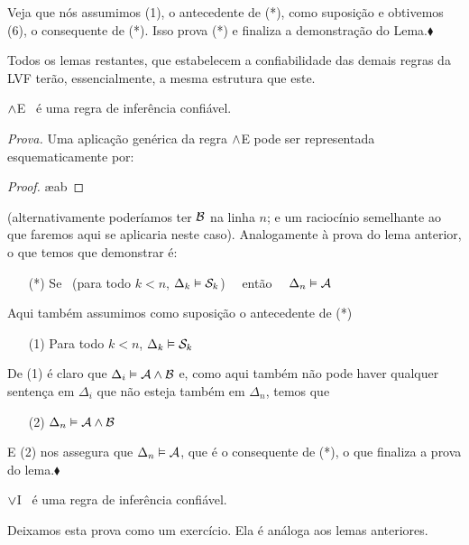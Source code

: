 Veja que nós assumimos (1), o antecedente de (*), como suposição e obtivemos (6), o consequente de (*). Isso prova (*) e finaliza a demonstração do Lema.$\blacklozenge$

Todos os lemas restantes, que estabelecem a confiabilidade das demais regras da LVF terão, essencialmente, a mesma estrutura que este.

\begin{factoidboxe}
	$\wedge$E \ é uma regra de inferência confiável.
\end{factoidboxe}

\noindent\emph{Prova.}
Uma aplicação genérica da regra $\wedge$E pode ser representada esquematicamente por:
	\begin{proof}
		 \ae{ab}
	\end{proof}\noindent
(alternativamente poderíamos ter $\mathcal{B}$ na linha $n$; e um raciocínio semelhante ao que faremos aqui se aplicaria neste caso).
Analogamente à prova do lema anterior, o que temos que demonstrar é:
\begin{itemize}
	\item[(*)]  Se  \ ({para todo}  $k<n$, $\Delta_k \vDash \mathcal{S}_k$) \ \ então \ \ $\Delta_n \vDash \mathcal{A}$
\end{itemize}
Aqui também assumimos como suposição o antecedente de (*)
\begin{itemize}
	\item[(1)] Para todo  $k<n$, $\Delta_k \vDash \mathcal{S}_k$
\end{itemize}
De (1) é claro que $\Delta_i \vDash \mathcal{A} \wedge \mathcal{B}$ e, como aqui também não pode haver qualquer sentença em $\Delta_i$ que não esteja também em $\Delta_n$, temos que
\begin{itemize}
	\item[(2)] $\Delta_n \vDash \mathcal{A} \wedge \mathcal{B}$
\end{itemize}
E (2) nos assegura que $\Delta_n \vDash \mathcal{A}$, que é o consequente de (*), o que finaliza a prova do lema.$\blacklozenge$

\begin{factoidboxe}
	$\vee$I \ é uma regra de inferência confiável.
\end{factoidboxe}

Deixamos esta prova como um exercício.
Ela é análoga aos lemas anteriores.


